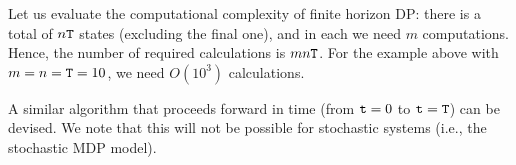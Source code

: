Let us evaluate the computational complexity of finite horizon DP: there is a total of $n{\tt T}$ states
(excluding the final one), and in each we need $m$ computations.
Hence, the number of required calculations is $mn{\tt T}$. For the
example above with $m = n = {\tt T} = 10$, we need $O({10^3})$
calculations.


\begin{remark}
    A similar algorithm that proceeds forward in time (from ${\tt t} = 0$
to ${\tt t} = {\tt T}$) can be devised. We note that this will not
be possible for stochastic systems (i.e., the stochastic MDP model).
\end{remark}



